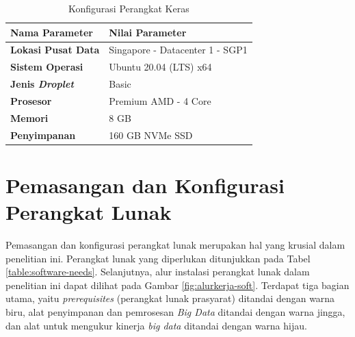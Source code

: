 \begin{table}[h]
	\centering
	\caption{Konfigurasi Perangkat Keras}
	\begin{tabular}{l p{9cm}} 
		\toprule
		\textbf{Nama Parameter}    & \textbf{Nilai Parameter} \\ 
        \midrule
		\textbf{Lokasi Pusat Data} & Singapore - Datacenter 1 - SGP1               \\ 
		\textbf{Sistem Operasi}    & Ubuntu 20.04 (LTS) x64                        \\
		\textbf{Jenis \textit{Droplet}}     & Basic                                         \\ 
		\textbf{Prosesor}          & Premium AMD - 4 Core                          \\ 
		\textbf{Memori}            & 8 GB                                          \\ 
		\textbf{Penyimpanan}       & 160 GB NVMe SSD                               \\ 
        \bottomrule
	\end{tabular}
	\label{table:conf-hardware}
\end{table}

\section{Pemasangan dan Konfigurasi Perangkat Lunak}
Pemasangan dan konfigurasi perangkat lunak merupakan hal yang krusial dalam penelitian ini. Perangkat lunak yang diperlukan ditunjukkan pada Tabel \ref{table:software-needs}. Selanjutnya, alur instalasi perangkat lunak dalam penelitian ini dapat dilihat pada Gambar \ref{fig:alurkerja-soft}. Terdapat tiga bagian utama, yaitu \textit{prerequisites} (perangkat lunak prasyarat) ditandai dengan warna biru, alat penyimpanan dan pemrosesan \textit{Big Data} ditandai dengan warna jingga, dan alat untuk mengukur kinerja \textit{big data} ditandai dengan warna hijau. 

